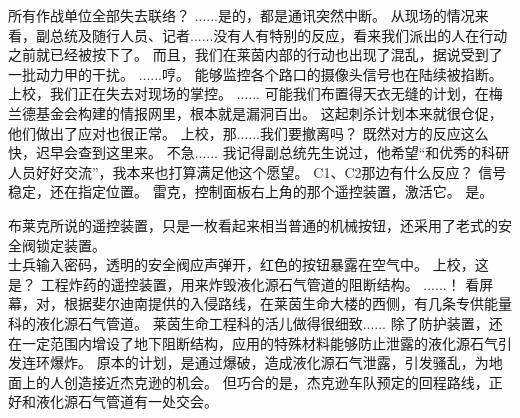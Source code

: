 \documentclass[openany]{book}
\begin{document}
\begin{dialogue}
     所有作战单位全部失去联络？
     ......是的，都是通讯突然中断。
     从现场的情况来看，副总统及随行人员、记者......没有人有特别的反应，看来我们派出的人在行动之前就已经被按下了。
     而且，我们在莱茵内部的行动也出现了混乱，据说受到了一批动力甲的干扰。
     ......哼。
     能够监控各个路口的摄像头信号也在陆续被掐断。
     上校，我们正在失去对现场的掌控。
     ......
     可能我们布置得天衣无缝的计划，在梅兰德基金会构建的情报网里，根本就是漏洞百出。
     这起刺杀计划本来就很仓促，他们做出了应对也很正常。
     上校，那......我们要撤离吗？
     既然对方的反应这么快，迟早会查到这里来。
     不急......
     我记得副总统先生说过，他希望“和优秀的科研人员好好交流”，我本来也打算满足他这个愿望。
     C1、C2那边有什么反应？
     信号稳定，还在指定位置。
     雷克，控制面板右上角的那个遥控装置，激活它。
     是。\par
    布莱克所说的遥控装置，只是一枚看起来相当普通的机械按钮，还采用了老式的安全阀锁定装置。\\
    士兵输入密码，透明的安全阀应声弹开，红色的按钮暴露在空气中。
     上校，这是？
     工程炸药的遥控装置，用来炸毁液化源石气管道的阻断结构。
     ......！
     看屏幕，对，根据斐尔迪南提供的入侵路线，在莱茵生命大楼的西侧，有几条专供能量科的液化源石气管道。
     莱茵生命工程科的活儿做得很细致......
     除了防护装置，还在一定范围内增设了地下阻断结构，应用的特殊材料能够防止泄露的液化源石气引发连环爆炸。
     原本的计划，是通过爆破，造成液化源石气泄露，引发骚乱，为地面上的人创造接近杰克逊的机会。
     但巧合的是，杰克逊车队预定的回程路线，正好和液化源石气管道有一处交会。
\end{dialogue}
\end{document}
